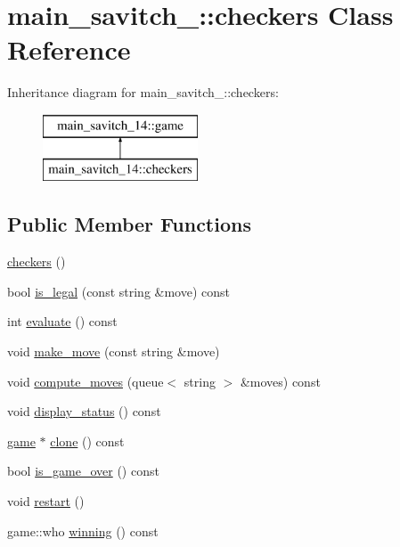 \hypertarget{classmain__savitch__14_1_1checkers}{}\section{main\+\_\+savitch\+\_\+:\+:checkers Class Reference}
\label{classmain__savitch__14_1_1checkers}
Inheritance diagram for main\+\_\+savitch\+\_\+:\+:checkers\+:\begin{figure}[H]
\begin{center}
\leavevmode
\includegraphics[height=2.000000cm]{classmain__savitch__14_1_1checkers}
\end{center}
\end{figure}
\subsection*{Public Member Functions}
\begin{DoxyCompactItemize}
\item 
\hyperlink{classmain__savitch__14_1_1checkers_ad57de7d84332c511eff8fb0f9dc3e47d}{checkers} ()
\item 
bool \hyperlink{classmain__savitch__14_1_1checkers_afc7d56fe1f0637a02cad352e9cda9ee3}{is\+\_\+legal} (const string \&move) const
\item 
int \hyperlink{classmain__savitch__14_1_1checkers_a1705b4e1bfe04205ebb7703925b50f9f}{evaluate} () const
\item 
void \hyperlink{classmain__savitch__14_1_1checkers_a8a08c0555d5b8c264472cc94a2f007e3}{make\+\_\+move} (const string \&move)
\item 
void \hyperlink{classmain__savitch__14_1_1checkers_aa4b4867ee171d04f5473f4ca38a9729a}{compute\+\_\+moves} (queue$<$ string $>$ \&moves) const
\item 
void \hyperlink{classmain__savitch__14_1_1checkers_aa99f69ed300d81b6340f87b59ebba031}{display\+\_\+status} () const
\item 
\hyperlink{classmain__savitch__14_1_1game}{game} $\ast$ \hyperlink{classmain__savitch__14_1_1checkers_a716b963325b1455e63c25afe89d617d9}{clone} () const
\item 
bool \hyperlink{classmain__savitch__14_1_1checkers_ab8481b1a443f4b190d3ff508ab6f62a7}{is\+\_\+game\+\_\+over} () const
\item 
void \hyperlink{classmain__savitch__14_1_1checkers_ad3ee0adbdabda9136ecd46b958c83d24}{restart} ()
\item 
game\+::who \hyperlink{classmain__savitch__14_1_1checkers_aad9a08662e9fdf62752c60997b29370e}{winning} () const
\end{DoxyCompactItemize}
